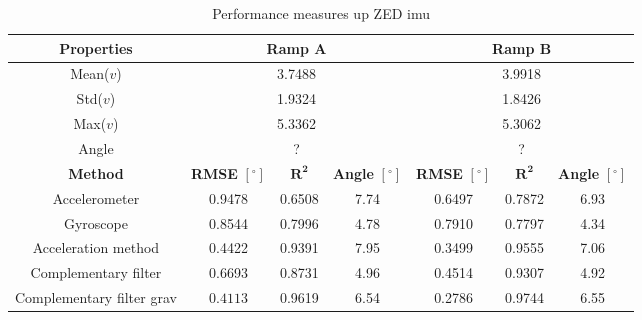 \begin{table}[htbp]
    \centering
    \caption{Performance measures up ZED \gls{imu}}
    \label{tab:eval_table_imu_up}
    \begin{tabular}[t]{ccccccc}
        \toprule
        \textbf{Properties}       & \multicolumn{3}{c}{\textbf{Ramp A}} & \multicolumn{3}{c}{\textbf{Ramp B}}                                                                                                     \\
        \midrule
        Mean($v$)                 & \multicolumn{3}{c}{3.7488}          & \multicolumn{3}{c}{3.9918}                                                                                                              \\
        Std($v$)                  & \multicolumn{3}{c}{1.9324}          & \multicolumn{3}{c}{1.8426}                                                                                                              \\
        Max($v$)                  & \multicolumn{3}{c}{5.3362}          & \multicolumn{3}{c}{5.3062}                                                                                                              \\
        Angle                     & \multicolumn{3}{c}{?}               & \multicolumn{3}{c}{?}                                                                                                                   \\
        \hline
        \textbf{Method}           & \textbf{RMSE} $[^\circ]$            & $\mathbf{R^2}$                      & \textbf{Angle} $[^\circ]$ & \textbf{RMSE} $[^\circ]$ & $\mathbf{R^2}$ & \textbf{Angle} $[^\circ]$ \\
        \cmidrule(lr){2-4}   \cmidrule(lr){5-7}
        Accelerometer             & 0.9478                              & 0.6508                              & 7.74                      & 0.6497                   & 0.7872         & 6.93                      \\
        Gyroscope                 & 0.8544                              & 0.7996                              & 4.78                      & 0.7910                   & 0.7797         & 4.34                      \\
        Acceleration method       & 0.4422                              & 0.9391                              & 7.95                      & 0.3499                   & 0.9555         & 7.06                      \\
        Complementary filter      & 0.6693                              & 0.8731                              & 4.96                      & 0.4514                   & 0.9307         & 4.92                      \\
        Complementary filter grav & $\mathbf{0.4113}$                   & 0.9619                              & 6.54                      & 0.2786                   & 0.9744         & 6.55                      \\
        \bottomrule
    \end{tabular}
\end{table}
